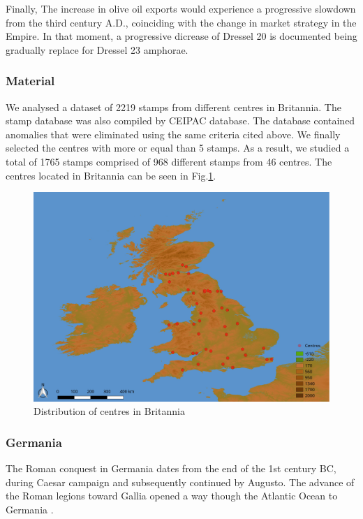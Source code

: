 \documentclass[review]{elsarticle}
\begin{document}
Finally, The increase in olive oil exports would experience a progressive slowdown
from the third century A.D., coinciding with the change in market strategy in the
Empire. In that moment, a progressive dicrease of Dressel 20 is documented being gradually replace for Dressel 23 amphorae. 


\subsubsection{Material}

We analysed a dataset of 2219 stamps from different centres in Britannia. 
The stamp database was also compiled by CEIPAC database. The database contained anomalies that were eliminated using the same criteria cited above. We finally selected the centres with more or equal than 5 stamps. As a result, we studied a total of 1765 stamps comprised of 968 different stamps from 46 centres.
The centres located in Britannia can be seen in Fig.\ref{britannia}.
 
\begin{figure}[htp]
	\centering
\includegraphics[width=\linewidth]{figs/britmap.pdf}
\caption{Distribution of centres in Britannia}
\label{britannia}
\end{figure} 


\subsubsection{Germania}

The Roman conquest in Germania dates from the end of the 1st century BC, during Caesar campaign and subsequently continued by Augusto. The advance of the Roman legions toward Gallia opened a way though the Atlantic Ocean to Germania \citep{remesal_annona_1986,
remesal_baetica_2002}.
\end{document}
